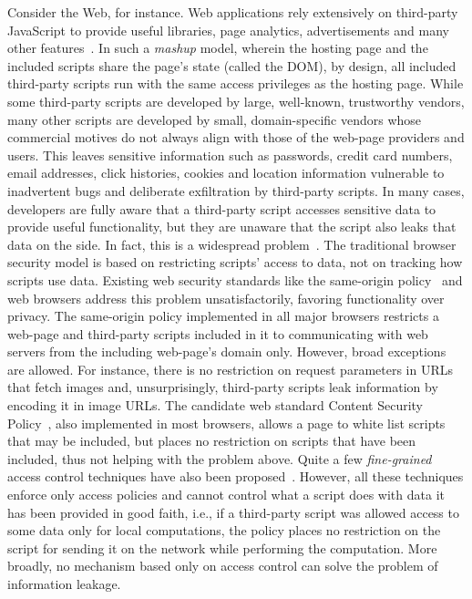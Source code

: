 Consider the Web, for instance. Web applications rely extensively on
third-party JavaScript to provide useful libraries, page analytics,
advertisements and many other features~\cite{nick12CCS}. In such a
\emph{mashup} model, wherein the hosting page and the included scripts  
share the page’s state (called the DOM), by design, all
included third-party scripts run with the same access privileges as
the hosting page. While some third-party scripts are developed by
large, well-known, trustworthy vendors, many other scripts are
developed by small, domain-specific vendors whose commercial motives
do not always align with those of the 
web-page providers and users. This leaves sensitive information such as
passwords, credit card numbers, email addresses, click histories,
cookies and location information vulnerable to inadvertent bugs and
deliberate exfiltration by third-party scripts. In many cases,
developers are fully aware that a third-party script accesses
sensitive data to provide useful functionality, but they are unaware
that the script also leaks that data on the side. In fact, this is a
widespread problem~\cite{jang10CCS}. 
%
The traditional browser security
model is based on restricting scripts’ access to data, not on tracking
how scripts use data. Existing web security standards like the
same-origin policy~\cite{sop} 
and web browsers address this problem unsatisfactorily, favoring
functionality over privacy. The same-origin policy implemented
in all major browsers restricts a web-page and third-party scripts
included in it to communicating with web servers from the including
web-page’s domain only. However, broad exceptions are allowed. For
instance, there is no restriction on request parameters in URLs that
fetch images and, unsurprisingly, third-party scripts leak information
by encoding it in image URLs. The candidate web standard Content
Security Policy~\cite{csp}, also implemented in most browsers,
allows a page to white list scripts that may be included, but places
no restriction on scripts that have been included, thus not helping
with the problem above. 
%
Quite a few \emph{fine-grained} access control
techniques have also been proposed~\cite{conscript, adjail,
  zhouESORICS11, ccs13crypton, adsafe, fbjs, caja, webjail}. 
However, all these techniques enforce only access policies
and cannot control what a script does with data it has been provided
in good faith, i.e., if a third-party script was allowed access to
some data only for local computations, the policy places no
restriction on the script for sending it on the network while
performing the computation. More broadly, no mechanism based only
on access control can solve the problem of information leakage.  

